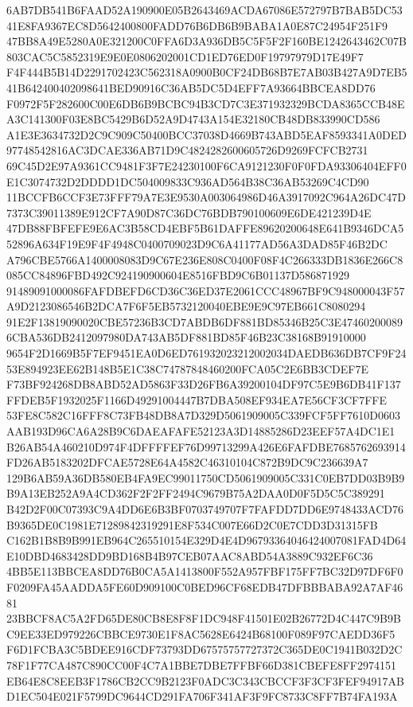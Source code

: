 \documentclass[UTF8,fontset=fandol,zihao=-4,a4paper]{ctexart}
\begin{document}
{{6AB7DB541B6FAAD52A190900E05B2643469ACDA67086E572797B7BAB5DC5341E8FA9367EC8D5642400800FADD76B6DB6B9BABA1A0E87C24954F251F9
47BB8A49E5280A0E321200C0FFA6D3A936DB5C5F5F2F160BE1242643462C07B803CAC5C5852319E9E0E0806202001CD1ED76ED0F19797979D17E49F7
F4F444B5B14D2291702423C562318A0900B0CF24DB68B7E7AB03B427A9D7EB541B642400402098641BED90916C36AB5DC5D4EFF7A93664BBCEA8DD76
F0972F5F282600C00E6DB6B9BCBC94B3CD7C3E371932329BCDA8365CCB48EA3C141300F03E8BC5429B6D52A9D4743A154E32180CB48DB833990CD586
A1E3E3634732D2C9C909C50400BCC37038D4669B743ABD5EAF8593341A0DED97748542816AC3DCAE336AB71D9C4824282600605726D9269FCFCB2731
69C45D2E97A9361CC9481F3F7E24230100F6CA9121230F0F0FDA93306404EFF0E1C3074732D2DDDD1DC504009833C936AD564B38C36AB53269C4CD90
11BCCFB6CCF3E73FFF79A7E3E9530A003064986D46A3917092C964A26DC47D7373C39011389E912CF7A90D87C36DC76BDB790100609E6DE421239D4E
47DB88FBFEFE9E6AC3B58CD4EBF5B61DAFFE89620200648E641B9346DCA552896A634F19E9F4F4948C0400709023D9C6A41177AD56A3DAD85F46B2DC
A796CBE5766A1400008083D9C67E236E808C0400F08F4C266333DB1836E266C8085CC84896FBD492C924190900604E8516FBD9C6B01137D586871929
91489091000086FAFDBEFD6CD36C36ED37E2061CCC48967BF9C948000043F57A9D2123086546B2DCA7F6F5EB5732120040EBE9E9C97EB661C8080294
91E2F13819090020CBE57236B3CD7ABDB6DF881BD85346B25C3E474602000896CBA536DB2412097980DA743AB5DF881BD85F46B23C38168B91910000
9654F2D1669B5F7EF9451EA0D6ED761932023212002034DAEDB636DB7CF9F2453E894923EE62B148B5E1C38C74787848460200FCA05C2E6BB3CDEF7E
F73BF924268DB8ABD52AD5863F33D26FB6A39200104DF97C5E9B6DB41F137FFDEB5F1932025F1166D49291004447B7DBA508EF934EA7E56CF3CF7FFE
53FE8C582C16FFF8C73FB48DB8A7D329D5061909005C339FCF5FF7610D0603AAB193D96CA6A28B9C6DAEAFAFE52123A3D14885286D23EEF57A4DC1E1
B26AB54A460210D974F4DFFFFEF76D99713299A426E6FAFDBE7685762693914FD26AB5183202DFCAE5728E64A4582C46310104C872B9DC9C236639A7
129B6AB59A36DB580EB4FA9EC99011750CD5061909005C331C0EB7DD03B9B9B9A13EB252A9A4CD362F2F2FF2494C9679B75A2DAA0D0F5D5C5C389291
B42D2F00C07393C9A4DD6E6B3BF0703749707F7FAFDD7DD6E9748433ACD76B9365DE0C1981E71289842319291E8F534C007E66D2C0E7CDD3D31315FB
C162B1B8B9B991EB964C265510154E329D4E4D96793364046424007081FAD4D64E10DBD4683428DD9BD168B4B97CEB07AAC8ABD54A3889C932EF6C36
4BB5E113BBCEA8DD76B0CA5A1413800F552A957FBF175FF7BC32D97DF6F0F0209FA45AADDA5FE60D909100C0BED96CF68EDB47DFBBBABA92A7AF4681
23BBCF8AC5A2FD65DE80CB8E8F8F1DC948F41501E02B26772D4C447C9B9BC9EE33ED979226CBBCE9730E1F8AC5628E6424B68100F089F97CAEDD36F5
F6D1FCBA3C5BDEE916CDF73793DD67575757727372C365DE0C1941B032D2C78F1F77CA487C890CC00F4C7A1BBE7DBE7FFBF66D381CBEFE8FF2974151
EB64E8C8EEB3F1786CB2CC9B2123F0ADC3C343CBCCF3F3CF3FEF94917ABD1EC504E021F5799DC9644CD291FA706F341AF3F9FC8733C8FF7B74FA193A
}}
\end{document}
